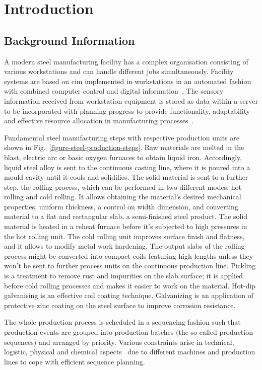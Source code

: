 \chapter{Introduction}

\section{Background Information}\label{background_information}
A modern steel manufacturing facility has a complex organisation consisting of various workstations and can handle different jobs simultaneously. Facility systems are based on \ac{cim} implemented in workstations in an automated fashion with combined computer control and digital information~\cite{waldner1992}. The sensory information received from workstation equipment is stored as data within a server to be incorporated with planning progress to provide functionality, adaptability and effective resource allocation in manufacturing processes~\cite{Saadaoui2019}.

Fundamental steel manufacturing steps with respective production units are shown in Fig.~\ref{figure-steel-production-steps}. Raw materials are melted in the blast, electric arc or basic oxygen furnaces to obtain liquid iron. Accordingly, liquid steel alloy is sent to the continuous casting line, where it is poured into a mould cavity until it cools and solidifies. The solid material is sent to a further step, the rolling process, which can be performed in two different modes: hot rolling and cold rolling. It allows obtaining the material's desired mechanical properties, uniform thickness, a control on width dimension, and converting material to a flat and rectangular slab, a semi-finished steel product. The solid material is heated in a reheat furnace before it's subjected to high pressures in the hot rolling unit. The cold rolling unit improves surface finish and flatness, and it allows to modify metal work hardening. The output slabs of the rolling process might be converted into compact coils featuring high lengths unless they won't be sent to further process units on the continuous production line. Pickling is a treatment to remove rust and impurities on the slab surface; it is applied before cold rolling processes and makes it easier to work on the material. Hot-dip galvanising is an effective coil coating technique. Galvanizing is an application of protective zinc coating on the steel surface to improve corrosion resistance.

The whole production process is scheduled in a sequencing fashion such that production events are grouped into production batches (the so-called production sequences) and arranged by priority. Various constraints arise in technical, logistic, physical and chemical aspects~\cite{cowling2001design, OZGUR2021106606} due to different machines and production lines to cope with efficient sequence planning.
\clearpage

